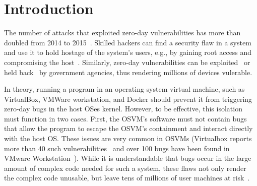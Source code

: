 \section{Introduction}
\label{sec.introduction}

%
The number of attacks that exploited zero-day vulnerabilities has more than 
doubled from 2014 to 2015~\cite{zero-day}. Skilled hackers can find a security 
flaw in a system and use it to hold hostage of the system's users, e.g., by 
gaining root access and compromising the host~\cite{linux-0day}. Similarly, zero-day 
vulnerabilities can be exploited~\cite{fbi-0day} or held back~\cite{nsa-0day} by government 
agencies, thus rendering millions of devices vulerable.
%


In theory, running a program in an operating system virtual machine, such as 
VirtualBox, VMWare workstation, and Docker should prevent it from triggering 
zero-day bugs in the host OSes kernel.  However, to be 
effective, this isolation must function in two cases.  First, the OSVM's 
software must not contain bugs that allow the program to escape the 
OSVM's containment and interact directly with the host OS.  These
issues are very common in OSVMs (Virtualbox reports more than 40 such 
vulnerabilities~\cite{Virtualbox-Vulnerabilities} and over 100 bugs have 
been found in VMware Workstation~\cite{VMWare-Vulnerabilities}).  While it is understandable that
bugs occur in the large amount of complex code needed for such a 
system, these flaws not only render the complex code unusable, but 
leave tens of millions of user machines at risk~\cite{linux-0day}.


